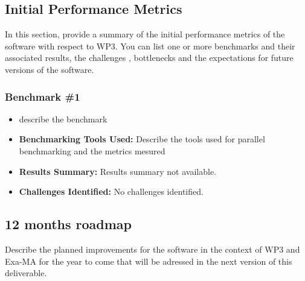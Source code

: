 \subsection{Initial Performance Metrics}
\label{sec:WP3:Freefem++:metrics}

In this section, provide a summary of the initial performance metrics of the software with respect to WP3.
You can list one or more benchmarks and their associated results, the challenges , bottlenecks and the expectations for future versions of the software.



\subsubsection{Benchmark \#1}
\begin{itemize}
    \item describe the benchmark
    \item \textbf{Benchmarking Tools Used:} Describe the tools used for parallel benchmarking and the metrics mesured
    \item \textbf{Results Summary:} Results summary not available.
    \item \textbf{Challenges Identified:} No challenges identified.
\end{itemize}

\subsection{12 months roadmap}
\label{sec:WP3:Freefem++:roadmap}

Describe the planned improvements  for the software in the context of WP3 and Exa-MA for the year to come that will be adressed in the next version of this deliverable.